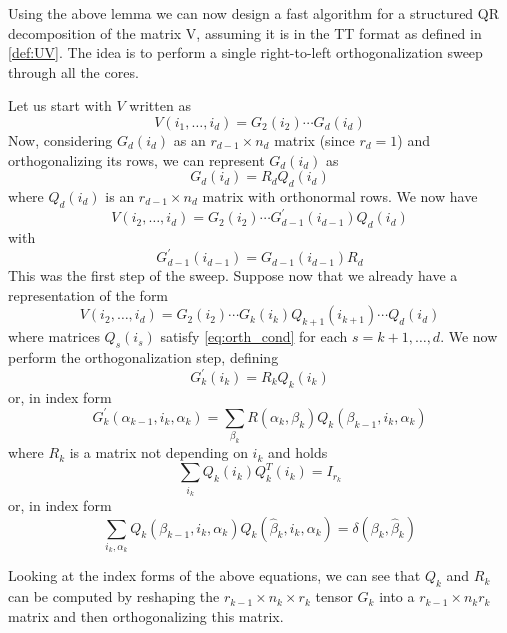 Using the above lemma we can now design a fast algorithm for a structured QR decomposition of the matrix V, assuming it is in the TT format as defined in \ref{def:UV}. The idea is to perform a single right-to-left orthogonalization sweep through all the cores.

Let us start with $V$ written as
\begin{equation*}
  V(i_1,\ldots,i_d) = G_2(i_2) \cdots G_d(i_d)
\end{equation*}
Now, considering $G_d(i_d)$ as an $r_{d-1} \times n_d$ matrix (since $r_d = 1$) and orthogonalizing its rows, we can represent $G_d(i_d)$ as
\begin{equation*}
  G_d(i_d) = R_d Q_d(i_d)
\end{equation*}
where $Q_d(i_d)$ is an $r_{d-1} \times n_d$ matrix with orthonormal rows.
We now have
\begin{equation*}
  V(i_2,\ldots,i_d) = G_2(i_2) \cdots G^\prime_{d-1}(i_{d-1}) Q_d(i_d)
\end{equation*}
with
\begin{equation*}
  G^\prime_{d-1}(i_{d-1}) = G_{d-1}(i_{d-1}) R_d
\end{equation*}
This was the first step of the sweep. Suppose now that we already have a representation of the form
\begin{equation*}
  V(i_2,\ldots,i_d) = G_2(i_2) \cdots G_k(i_k) Q_{k+1}(i_{k+1}) \cdots Q_d(i_d)
\end{equation*}
where matrices $Q_s(i_s)$ satisfy \eqref{eq:orth_cond} for each $s = k+1, \ldots, d$. We now perform the orthogonalization step, defining
\begin{equation*}
  G^\prime_k(i_k) = R_k Q_k(i_k)
\end{equation*}
or, in index form
\begin{equation*}
  G^\prime_k (\alpha_{k-1},i_k,\alpha_k) = \sum_{\beta_k} R(\alpha_k,\beta_k) Q_k(\beta_{k-1},i_k,\alpha_k)
\end{equation*}
where $R_k$ is a matrix not depending on $i_k$ and holds
\begin{equation*}
  \sum_{i_k} Q_k(i_k) Q_k^T(i_k) = I_{r_k}
\end{equation*}
or, in index form
\begin{equation*}
  \sum_{i_k,\alpha_k} Q_k(\beta_{k-1},i_k,\alpha_k)Q_k(\hat{\beta}_k,i_k,\alpha_k) = \delta(\beta_k,\hat{\beta}_k)
\end{equation*}

Looking at the index forms of the above equations, we can see that $Q_k$ and $R_k$ can be computed by reshaping the $r_{k-1} \times n_k \times r_k$ tensor $G_k$ into a $r_{k-1} \times n_k r_k$ matrix and then orthogonalizing this matrix.

